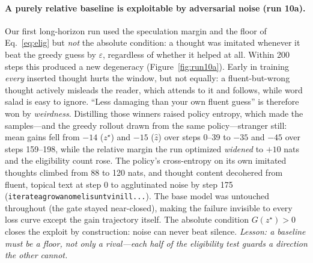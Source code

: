 \documentclass{article} %
\newcommand{\thought}{z}
\newcommand{\spec}{\hat{\thought}}
\newcommand{\best}{\thought^{\star}}
\newcommand{\gain}{G}
\begin{document}
\paragraph{A purely relative baseline is exploitable by adversarial noise (run 10a).} Our first long-horizon run used the speculation margin and the floor of Eq.~\eqref{eq:elig} but \emph{not} the absolute condition: a thought was imitated whenever it beat the greedy guess by $\varepsilon$, regardless of whether it helped at all. Within 200 steps this produced a new degeneracy (Figure~\ref{fig:run10a}). Early in training \emph{every} inserted thought hurts the window, but not equally: a fluent-but-wrong thought actively misleads the reader, which attends to it and follows, while word salad is easy to ignore. ``Less damaging than your own fluent guess'' is therefore won by \emph{weirdness}. Distilling those winners raised policy entropy, which made the samples---and the greedy rollout drawn from the same policy---stranger still: mean gains fell from $-14$ ($\best$) and $-15$ ($\spec$) over steps 0--39 to $-35$ and $-45$ over steps 159--198, while the relative margin the run optimized \emph{widened} to $+10$ nats and the eligibility count rose. The policy's cross-entropy on its own imitated thoughts climbed from 88 to 120 nats, and thought content decohered from fluent, topical text at step 0 to agglutinated noise by step 175 (\texttt{iterateagrowanomelisuntvinill...}). The base model was untouched throughout (the gate stayed near-closed), making the failure invisible to every loss curve except the gain trajectory itself. The absolute condition $\gain(\best) > 0$ closes the exploit by construction: noise can never beat silence. \emph{Lesson: a baseline must be a floor, not only a rival---each half of the eligibility test guards a direction the other cannot.}
\end{document}
